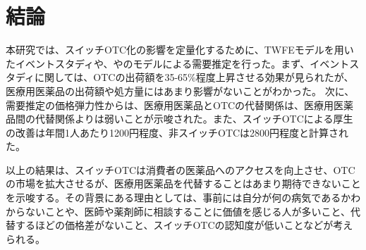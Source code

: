 \documentclass[a4paper,11pt,uplatex]{jsarticle}
\theoremstyle{definition}
\begin{document}
\section{結論}
本研究では、スイッチOTC化の影響を定量化するために、TWFEモデルを用いたイベントスタディや、\cite{Berry1994}や\cite{BLP}のモデルによる需要推定を行った。まず、イベントスタディに関しては、OTCの出荷額を35-65\%程度上昇させる効果が見られたが、医療用医薬品の出荷額や処方量にはあまり影響がないことがわかった。
次に、需要推定の価格弾力性からは、医療用医薬品とOTCの代替関係は、医療用医薬品間の代替関係よりは弱いことが示唆された。また、スイッチOTCによる厚生の改善は年間1人あたり1200円程度、非スイッチOTCは2800円程度と計算された。

以上の結果は、スイッチOTCは消費者の医薬品へのアクセスを向上させ、OTCの市場を拡大させるが、医療用医薬品を代替することはあまり期待できないことを示唆する。その背景にある理由としては、事前には自分が何の病気であるかわからないことや、医師や薬剤師に相談することに価値を感じる人が多いこと、代替するほどの価格差がないこと、スイッチOTCの認知度が低いことなどが考えられる。
\end{document}

